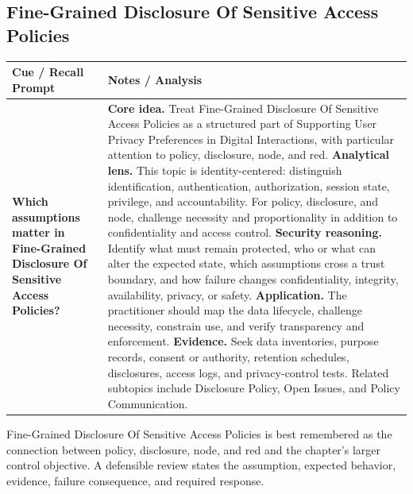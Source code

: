 \documentclass[11pt]{article}
\newcommand{\CornellHeader}{%
\rowcolor{Navy}\color{white}\bfseries Cue / Recall Prompt & \color{white}\bfseries Notes / Analysis\\\hline}
\newcommand{\CornellRow}[2]{%
\cellcolor{CueGray}\RaggedRight\textbf{#1} & \RaggedRight #2\\\hline}
\begin{document}
\subsection*{Fine-Grained Disclosure Of Sensitive Access Policies}
\begin{longtable}{>{\RaggedRight\arraybackslash}p{}|>{\RaggedRight\arraybackslash}p{}}
\CornellHeader
\CornellRow{Which assumptions matter in Fine-Grained Disclosure Of Sensitive Access Policies?}{\textbf{Core idea.} Treat Fine-Grained Disclosure Of Sensitive Access Policies as a structured part of Supporting User Privacy Preferences in Digital Interactions, with particular attention to policy, disclosure, node, and red. \textbf{Analytical lens.} This topic is identity-centered: distinguish identification, authentication, authorization, session state, privilege, and accountability. For policy, disclosure, and node, challenge necessity and proportionality in addition to confidentiality and access control. \textbf{Security reasoning.} Identify what must remain protected, who or what can alter the expected state, which assumptions cross a trust boundary, and how failure changes confidentiality, integrity, availability, privacy, or safety. \textbf{Application.} The practitioner should map the data lifecycle, challenge necessity, constrain use, and verify transparency and enforcement. \textbf{Evidence.} Seek data inventories, purpose records, consent or authority, retention schedules, disclosures, access logs, and privacy-control tests. Related subtopics include Disclosure Policy, Open Issues, and Policy Communication.}
\end{longtable}
\begin{topicsummary}
Fine-Grained Disclosure Of Sensitive Access Policies is best remembered as the connection between policy, disclosure, node, and red and the chapter's larger control objective. A defensible review states the assumption, expected behavior, evidence, failure consequence, and required response.
\end{topicsummary}
\end{document}
